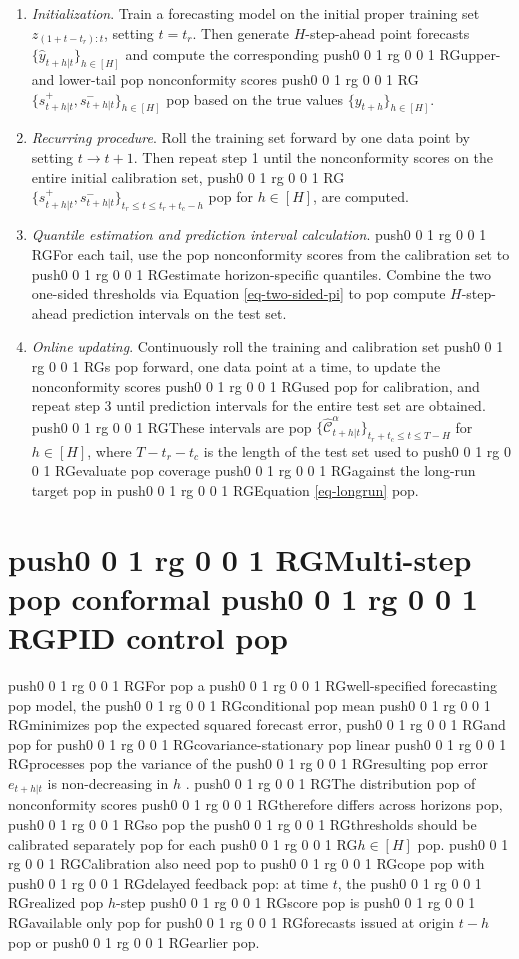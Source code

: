 \documentclass[
  american,
  12pt]{article}
\theoremstyle{plain}
\theoremstyle{plain}
\theoremstyle{remark}
\newcommand{\CPTSadd}[1]{\ifmmode\else\leavevmode\fi\pdfcolorstack 0 push{0 0 1 rg 0 0 1 RG}#1\pdfcolorstack 0 pop}
\begin{document}
\begin{enumerate}
\def\labelenumi{\arabic{enumi}.}
\item
  \emph{Initialization}. Train a forecasting model on the initial proper
  training set \(z_{(1+t-t_r):t}\), setting \(t=t_r\). Then generate
  \(H\)-step-ahead point forecasts \(\{\hat{y}_{t+h|t}\}_{h\in[H]}\) and
  compute the corresponding \CPTSadd{upper- and lower-tail} nonconformity scores
  \CPTSadd{\(\{s_{t+h|t}^{+},s_{t+h|t}^{-}\}_{h\in[H]}\)} based on the true values
  \(\{y_{t+h}\}_{h\in[H]}\).
\item
  \emph{Recurring procedure}. Roll the training set forward by one data
  point by setting \(t \rightarrow t+1\). Then repeat step 1 until the
  nonconformity scores on the entire initial calibration set,
  \CPTSadd{\(\{s_{t+h|t}^{+},s_{t+h|t}^{-}\}_{t_r \leq t \leq t_r+t_c-h}\)} for
  \(h\in[H]\), are computed.
\item
  \emph{Quantile estimation and prediction interval calculation}. \CPTSadd{For
  each tail, use the} nonconformity scores from the calibration set to
  \CPTSadd{estimate horizon-specific quantiles. Combine the two one-sided
  thresholds via Equation \eqref{eq-two-sided-pi} to} compute
  \(H\)-step-ahead prediction intervals on the test set.
\item
  \emph{Online updating}. Continuously roll the training and calibration
  set\CPTSadd{s} forward, one data point at a time, to update the nonconformity
  scores \CPTSadd{used} for calibration, and repeat step 3 until prediction
  intervals for the entire test set are obtained. \CPTSadd{These intervals are}
  \(\{\hat{\mathcal{C}}_{t+h|t}^{\alpha}\}_{t_r+t_c \leq t \leq T-H}\)
  for \(h \in [H]\), where \(T-t_r-t_c\) is the length of the test set
  used to \CPTSadd{evaluate} coverage \CPTSadd{against the long-run target} in \CPTSadd{Equation
  \eqref{eq-longrun}}.
\end{enumerate}

\section{\CPTSadd{Multi-step} conformal \CPTSadd{PID control}}\label{sec-mpid}

\CPTSadd{For} a \CPTSadd{well-specified forecasting} model, the \CPTSadd{conditional} mean \CPTSadd{minimizes}
the expected squared forecast error, \CPTSadd{and} for \CPTSadd{covariance-stationary}
linear \CPTSadd{processes} the variance of the \CPTSadd{resulting} error \(e_{t+h|t}\) is
non-decreasing in \(h\) \citep{diebold1996, patton2007}. \CPTSadd{The
distribution} of nonconformity scores \CPTSadd{therefore differs across horizons},
\CPTSadd{so} the \CPTSadd{thresholds should be calibrated separately} for each \CPTSadd{\(h\in[H]\)}.
\CPTSadd{Calibration also need} to \CPTSadd{cope} with \CPTSadd{delayed feedback}: at time \(t\), the
\CPTSadd{realized} \(h\)-step \CPTSadd{score} is \CPTSadd{available only} for \CPTSadd{forecasts issued at
origin \(t-h\)} or \CPTSadd{earlier}.
\end{document}
